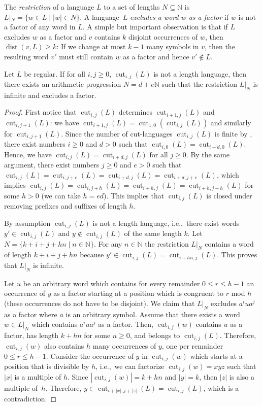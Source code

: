 \documentclass{theoretics}
\newcommand{\N}{\mathbb{N}}
\DeclareMathOperator{\dist}{dist}
\DeclareMathOperator{\cut}{cut}
\renewcommand{\geq}{\geqslant}
\renewcommand{\leq}{\leqslant}
\renewcommand{\ge}{\geq}
\renewcommand{\le}{\leq}
\begin{document}
The {\em restriction} of a language $L$ to a set of lengths $N \subseteq \N$
is $L|_N = \{ w \in L \mid |w| \in N \}$.
A language~$L$ {\em excludes a word $w$ as a factor} if $w$ is not a factor of any word in $L$.
A simple but important observation is that if $L$ excludes $w$ as a factor
and $v$ contains $k$ disjoint occurrences of $w$,
then $\dist(v,L) \ge k$: If we change at most $k-1$ many symbols in $v$, then the resulting
word $v'$ must still contain $w$ as a factor and hence $v' \notin L$. 

\begin{lemma}
	\label{prop-nontriv}
	Let $L$ be regular. If for all $i, j \ge 0$, $\cut_{i,j}(L)$ is not a length language,
	then there exists an arithmetic progression  $N = d+e\N$  such that 
	the restriction $L|_N$ is infinite and excludes a factor. 
\end{lemma}

\begin{proof}
	First notice that $\cut_{i,j}(L)$ determines $\cut_{i+1,j}(L)$ and $\cut_{i,j+1}(L)$: we have
	$\cut_{i+1,j}(L) = \cut_{1,0}(\cut_{i,j}(L))$ and similarly for $\cut_{i,j+1}(L)$.
	Since the number of cut-languages $\cut_{i,j}(L)$ is finite by , there exist numbers $i \ge 0$ and $d > 0$ such that
	$\cut_{i,0}(L) = \cut_{i+d,0}(L)$. Hence, we have $\cut_{i,j}(L) = \cut_{i+d,j}(L)$ for all $j \ge 0$. 
	By the same argument, there exist numbers $j \ge 0$ and $e > 0$ such that
	$\cut_{i,j}(L) = \cut_{i,j+e}(L) = \cut_{i+d,j}(L) = \cut_{i+d,j+e}(L)$, which implies
	$\cut_{i,j}(L) = \cut_{i,j+h}(L) = \cut_{i+h,j}(L) = \cut_{i+h,j+h}(L)$ for some $h>0$ (we can take $h = ed$).
	This implies that $\cut_{i,j}(L)$ is closed under removing prefixes and suffixes of length $h$.
	
	By assumption $\cut_{i,j}(L)$ is not a length language,
	i.e.,~there exist words $y' \in \cut_{i,j}(L)$ and $y \notin \cut_{i,j}(L)$
	of the same length $k$.
	Let $N = \{ k + i + j + hn \mid n \in \N \}$.
	For any $n \in \N$ the restriction $L|_N$ contains a word of length $k+i+j+hn$
	because $y' \in \cut_{i,j}(L) = \cut_{i+hn,j}(L)$.
	This proves that $L|_N$ is infinite.
	
	Let $u$ be an arbitrary word which contains for every remainder $0 \le r \le h-1$
	an occurrence of $y$ as a factor starting at a position which is congruent to $r$ mod $h$ (these occurrences do not have to be disjoint).
	We claim that $L|_N$ excludes $a^i u a^j$ as a factor where $a$ is an arbitrary symbol.
	Assume that there exists a word $w \in L|_N$ which contains $a^i u a^j$ as a factor.
	Then, $\cut_{i,j}(w)$ contains $u$ as a factor, has length $k+hn$ for some $n \ge 0$,
	and belongs to $\cut_{i,j}(L)$.
	Therefore, $\cut_{i,j}(w)$ also contains $h$ many occurrences of $y$, one per remainder $0 \le r \le h-1$.
	Consider the occurrence of $y$ in $\cut_{i,j}(w)$ which starts at a position that is divisible by $h$,
	i.e.,~we can factorize $\cut_{i,j}(w) = xyz$ such that $|x|$ is a multiple of $h$.
	Since $|\cut_{i,j}(w)|=k+hn$ and $|y|=k$, then $|z|$ is also a multiple of~$h$.
	Therefore, $y \in \cut_{i+|x|,j+|z|}(L) = \cut_{i,j}(L)$, which is a contradiction.
\end{proof}
\end{document}
